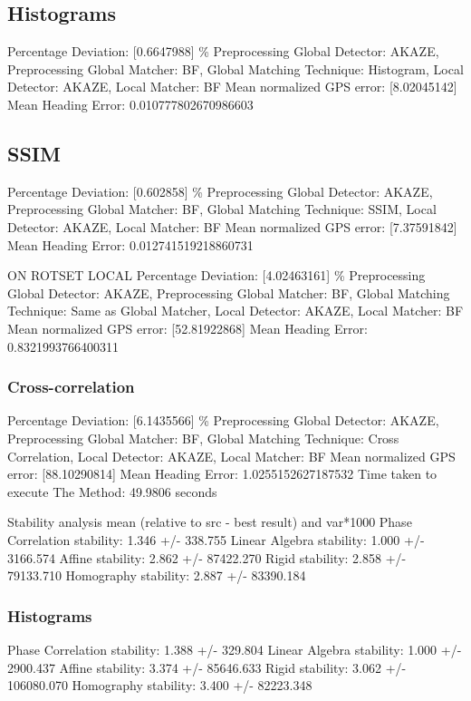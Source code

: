 \begin{itemize}
\subsection*{Histograms}
Percentage Deviation: [0.6647988] \%
Preprocessing Global Detector: AKAZE, Preprocessing Global Matcher: BF, Global Matching Technique: Histogram, Local Detector: AKAZE, Local Matcher: BF
Mean normalized GPS error: [8.02045142]
 Mean Heading Error: 0.010777802670986603


\subsection*{SSIM}
Percentage Deviation: [0.602858] \%
Preprocessing Global Detector: AKAZE, Preprocessing Global Matcher: BF, Global Matching Technique: SSIM, Local Detector: AKAZE, Local Matcher: BF
Mean normalized GPS error: [7.37591842]
 Mean Heading Error: 0.012741519218860731


 ON ROTSET
 LOCAL
Percentage Deviation: [4.02463161] \%
Preprocessing Global Detector: AKAZE, Preprocessing Global Matcher: BF, Global Matching Technique: Same as Global Matcher, Local Detector: AKAZE, Local Matcher: BF
Mean normalized GPS error: [52.81922868]
Mean Heading Error: 0.8321993766400311



\subsubsection*{Cross-correlation}
Percentage Deviation: [6.1435566] \%
Preprocessing Global Detector: AKAZE, Preprocessing Global Matcher: BF, Global Matching Technique: Cross Correlation, Local Detector: AKAZE, Local Matcher: BF
Mean normalized GPS error: [88.10290814]
 Mean Heading Error: 1.0255152627187532
Time taken to execute The Method: 49.9806 seconds

Stability analysis mean (relative to src - best result) and var*1000
Phase Correlation stability: 1.346 +/- 338.755
Linear Algebra stability: 1.000 +/- 3166.574
Affine stability: 2.862 +/- 87422.270
Rigid stability: 2.858 +/- 79133.710
Homography stability: 2.887 +/- 83390.184

\subsubsection*{Histograms}
Phase Correlation stability: 1.388 +/- 329.804
Linear Algebra stability: 1.000 +/- 2900.437
Affine stability: 3.374 +/- 85646.633
Rigid stability: 3.062 +/- 106080.070
Homography stability: 3.400 +/- 82223.348


\end{itemize}
